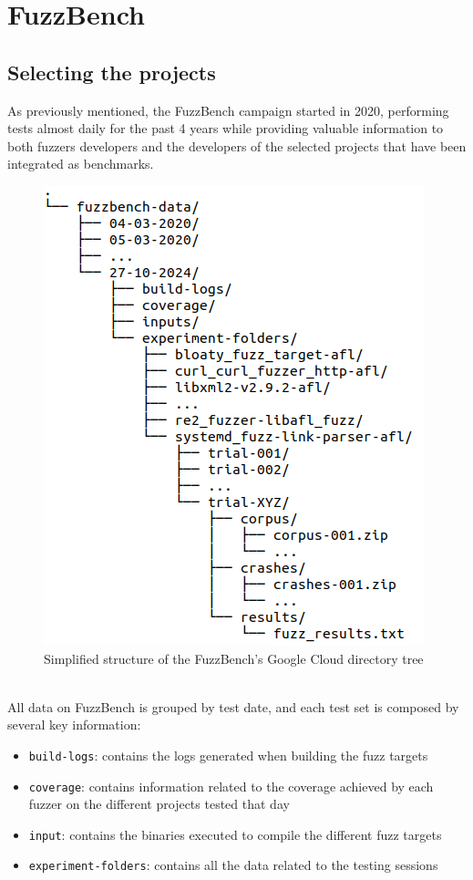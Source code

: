 \newpage
\section{FuzzBench}
\subsection{Selecting the projects}
As previously mentioned, the FuzzBench campaign started in 2020, performing tests almost daily for the past 4 years while providing valuable information to both fuzzers developers and the developers of the selected projects that have been integrated as benchmarks.
\begin{figure}[h]
\centering
\includegraphics[scale=0.4]{foto/tree.png}
\caption{Simplified structure of the FuzzBench's Google Cloud directory tree}
\label{fig:tree}
\end{figure}
\ \\
All data on FuzzBench is grouped by test date, and each test set is composed by several key information:
\begin{itemize}
    \item \verb|build-logs|: contains the logs generated when building the fuzz targets
    \item \verb|coverage|: contains information related to the coverage achieved by each fuzzer on the different projects tested that day
    \item \verb|input|: contains the binaries executed to compile the different fuzz targets
    \item \verb|experiment-folders|: contains all the data related to the testing sessions
\end{itemize}

